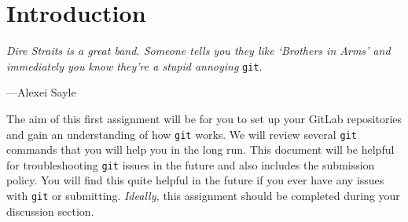 \section{Introduction}

\textwidth
\epigraph{\emph{Dire Straits is a great band. Someone tells you they like
`Brothers in Arms' and immediately you know they're a stupid annoying}
\texttt{git}.}{---Alexei Sayle}

\noindent The aim of this first assignment will be for you to set up your
GitLab repositories and gain an understanding of how \texttt{git} works.
We will review several \texttt{git} commands that you will help you in the long
run. This document will be helpful for troubleshooting \texttt{git} issues in
the future and also includes the submission policy. You will find this quite
helpful in the future if you ever have any issues with \texttt{git} or
submitting. \emph{Ideally,} this assignment should be completed during your
discussion section.
